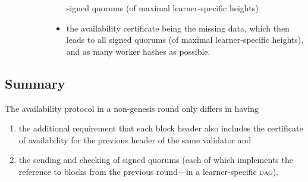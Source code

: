 \documentclass[%
dvipsnames
]{article}
\theoremstyle{definition}
\newcommand{\xnote}[1]{
  \marginnote{\footnotesize #1}%
}
\newcommand{\Dag}[1][]{\textsc{dag}#1\xspace}
\newcommand{\ie}[1][, ]{\emph{i.e.}#1}
\renewcommand{\todo}[2][]{}
\begin{document}
\begin{description}
\begin{description}
\begin{itemize}
      signed quorums (of maximal learner-specific heights)
    \item the availability certificate being the missing data,
      which then leads to all
      signed quorums (of maximal learner-specific heights),
      and as many worker hashes as possible. 
    \end{itemize}
  \end{description}


\end{description}

\todo{we have elided the checks of validity of headers , 
  which we describe later in detail ?
}

\todo[inline,size=normalsize]{describe in detail how

  the checking of the availability of the headers takes place
}

\subsection{Summary}
\todo[inline,size=normalsize]{probably it makes sense to have two “copies” of the integrity
  protocol
  as it is extremely short ... 
  and we can remove the “forward pointing” defs of signed quorums and blocks
  \\
  then we can remove this
}
The availability protocol in a non-genesis round
only differs in having
\begin{enumerate}
\item the additional requirement
that each block header also includes
the certificate of availability
for the previous header of the same validator and
\item
the sending and checking of signed quorums
(each of which implements the reference to
blocks from the previous round—in a learner-specific \Dag).
\end{enumerate}
\end{document}

